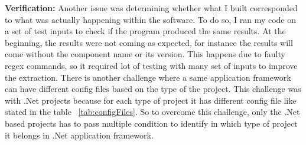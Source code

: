 \textbf{Verification:} Another issue was determining whether what I built corresponded to what was actually happening within the software. To do so, I ran my code on a set of test inputs to check if the program produced the same results. At the beginning, the results were not coming as expected, for instance the results will come without the component name or its version. This happens due to faulty regex commands, so it required lot of testing with many set of inputs to improve the extraction. There is another challenge where a same application framework can have different config files based on the type of the project. This challenge was with .Net projects because for each type of project it has different config file like stated in the table ~\ref{tab:configFiles}. So to overcome this challenge, only the .Net based projects has to pass multiple condition to identify in which type of project it belongs in .Net application framework.

%
